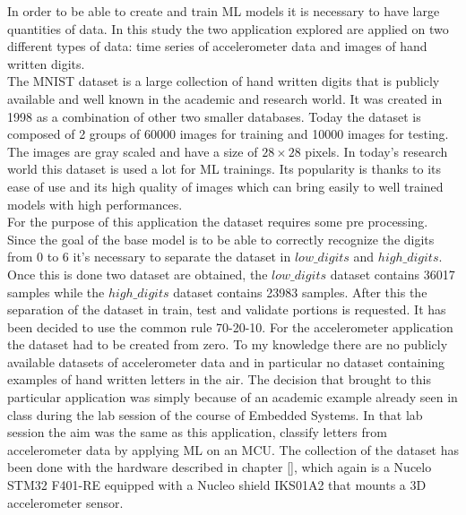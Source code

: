 \documentclass[12pt]{report}
\begin{document}
In order to be able to create and train ML models it is necessary to have large quantities of data. In this study the two application explored are applied on two different types of data: time series of accelerometer data and images of hand written digits. \\
The MNIST dataset is a large collection of hand written digits that is publicly available and well known in the academic and research world. It was created in 1998 as a combination of other two smaller databases. Today the dataset is composed of 2 groups of 60000 images for training and 10000 images for testing. The images are gray scaled and have a size of $28 \times 28$ pixels. In today's research world this dataset is used a lot for ML trainings. Its popularity is thanks to its ease of use and its high quality of images which can bring easily to well trained models with high performances.\\
For the purpose of this application the dataset requires some pre processing. Since the goal of the base model is to be able to correctly recognize the digits from 0 to 6 it's necessary to separate the dataset in $low\_digits$ and $high\_digits$. Once this is done two dataset are obtained, the $low\_digits$ dataset contains 36017 samples while the $high\_digits$ dataset contains 23983 samples. After this the separation of the dataset in train, test and validate portions is requested. It has been decided to use the common rule 70-20-10. 
\bigskip
For the accelerometer application the dataset had to be created from zero. To my knowledge there are no publicly available datasets of accelerometer data and in particular no dataset containing examples of hand written letters in the air. The decision that brought to this particular application was simply because of an academic example already seen in class during the lab session of the course of Embedded Systems. In that lab session the aim was the same as this application, classify letters from accelerometer data by applying ML on an MCU. The collection of the dataset has been done with the hardware described in chapter \ref{}, which again is a Nucelo STM32 F401-RE equipped with a Nucleo shield IKS01A2 that mounts a 3D accelerometer sensor. \\
\end{document}

